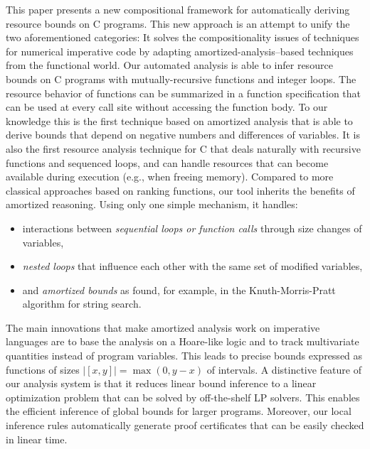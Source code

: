 \documentclass[nocopyrightspace,preprint,pldi]{sigplanconf-pldi15}
\newcommand{\ifshort}[2]{\ifx\fullversion\undefined{#1}\else{#2}\fi}
\newcommand{\itemskip}[0]{\ifshort{\vspace{-3pt}}{}}
\newcommand{\itemskipIn}[0]{\ifshort{\vspace{-1pt}}{}}
\begin{document}
This paper presents a new compositional framework for automatically
deriving resource bounds on C programs.  This new
approach is an attempt to unify the two aforementioned
categories: It solves the compositionality issues of techniques
for numerical imperative code by adapting amortized-analysis--based
techniques from the functional world.
%
Our automated analysis is able to infer
resource bounds on C programs with mutually-recursive functions and integer loops.
%
The resource behavior of functions can be summarized
in a function specification that can be used at every
call site without accessing the function body.
%
To our knowledge this is the first technique based on
amortized analysis that is able to derive bounds that depend on negative numbers
and differences of variables.  It is also the first
resource analysis technique for C that deals naturally with
recursive functions and sequenced loops, and can handle resources that can
become available during execution (e.g., when freeing
memory).  Compared to more classical
approaches based on ranking functions, our tool inherits
the benefits of amortized reasoning.  Using only one
simple mechanism, it handles:
\itemskip
\begin{itemize}
\item interactions between \emph{sequential loops or
  function calls} through size changes of variables,
\itemskipIn
\item \emph{nested loops} that influence each other
  with the same set of modified variables,
\itemskipIn
\item and \emph{amortized bounds} as found, for example, in
  the Knuth-Morris-Pratt algorithm for string search.
\end{itemize}
\itemskip
The main innovations that make amortized analysis work
on imperative languages are to base the analysis on a
Hoare-like logic and to track multivariate quantities instead
of program variables.  This leads to precise bounds
expressed as functions of sizes $|[x, y]| = \max(0, y-x)$ of
intervals.
%
A distinctive feature of our analysis system is that
it reduces linear bound inference  to a linear optimization problem
that can be solved by off-the-shelf LP solvers.  This enables the
efficient inference of global bounds for larger programs.
%
Moreover, our local inference rules automatically generate
proof certificates that can be easily checked in linear time.
\end{document}
